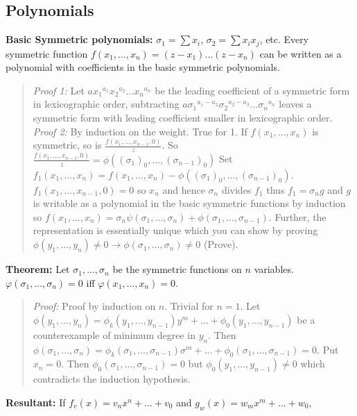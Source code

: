 \subsection{Polynomials}
{\bf Basic Symmetric polynomials:} $\sigma_1= \sum x_i$, $\sigma_2 = \sum x_i x_j$,
etc.  
Every symmetric function $f(x_1, \ldots , x_n)= (z-x_1) \ldots (z-x_n)$
can be written as a polynomial
with coefficients in the basic symmetric polynomials.  
\begin{quote}
\emph{Proof 1:}
Let $ a {x_1}^{a_1} {x_2}^{a_2} \ldots {x_n}^{a_n}$
be the leading coefficient of a symmetric form in lexicographic order,
subtracting
$a {\sigma_1}^{a_1 - a_2} {\sigma_2}^{a_2 - a_3} \ldots {\sigma_n}^{a_n}$
leaves a symmetric form with leading coefficient smaller in lexicographic
order.
\\
\emph{Proof 2:}  By induction on the weight.  True for 1.  If 
$f(x_1 , \ldots, x_n)$ is symmetric, so is
${\frac {f(x_1 , \ldots, x_{n-1},0)} z}$. 
So ${\frac {f(x_1 , \ldots, x_{n-1},0)} z}= 
\phi((\sigma_1)_0, \ldots , (\sigma_{n-1})_0)$
Set  
$f_1(x_1 , \ldots, x_n)=
f(x_1 , \ldots, x_n)-
\phi((\sigma_1)_0, \ldots , (\sigma_{n-1})_0)$.
$f_1(x_1 , \ldots, x_{n-1},0)=0$ so $x_n$ and hence $\sigma_n$ divides
$f_1$ thus $f_1 = \sigma_n g$ and $g$ is writable as a polynomial in the basic
symmetric functions by induction so
$f(x_1 , \ldots, x_n)= \sigma_n \psi(\sigma_1, \ldots , \sigma_n) 
+ \phi (\sigma_1 , \ldots , \sigma_{n-1})$.  Further, the representation is essentially
unique which you can show by proving 
$\phi(y_1 , \ldots , y_n) \ne 0 \rightarrow \phi(\sigma_1 , \ldots , \sigma_n) \ne 0 $
(Prove).
\end{quote}
{\bf Theorem:} Let $\sigma_1, \ldots , \sigma_n$ be the symmetric functions on $n$ variables.
$\varphi(\sigma_1 , \ldots , \sigma_n )=0 $ iff
$\varphi(x_1 , \ldots , x_n )=0 $.
\begin{quote}
\emph{Proof:} 
Proof by induction on $n$.  Trivial for $n=1$.  
Let $\phi(y_1, \ldots , y_n)=
\phi_k(y_1, \ldots , y_{n-1}) y^m + \ldots + \phi_0(y_1 , \ldots , y_{n-1})$ be a
counterexample of minimum degree in $y_n$.
Then $\phi(\sigma_1, \ldots , \sigma_n)=
\phi_k(\sigma_1, \ldots , \sigma_{n-1}) \sigma^m + \ldots + \phi_0(\sigma_1 , \ldots , \sigma_{n-1})= 0$.
Put $x_n=0$.  Then  
$\phi_0(\sigma_1 , \ldots , \sigma_{n-1})= 0$ but
$\phi_0(y_1 , \ldots , y_{n-1}) \neq 0$ which contradicts the induction hypothesis.
\end{quote}
{\bf Resultant:}
If $f_{v}(x)= v_{n}x^{n}+ \ldots + v_{0}$ and
$g_{w}(x)= w_{m}x^{m}+ \ldots + w_{0}$,
